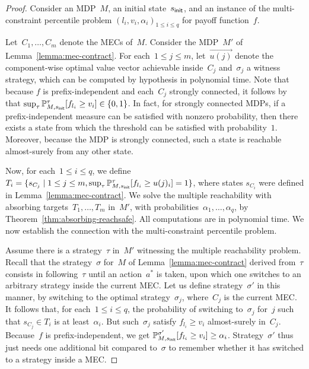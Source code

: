 \documentclass{llncs}
\newcommand{\initState}{\ensuremath{s_{{\sf init}}} }
\newcommand*{\pr}{\mathbb{P}}
\begin{document}
\begin{proof}
  Consider an MDP~$M$, an initial state~$\initState$, and an instance of the multi-constraint percentile problem $(l_i,v_i,\alpha_i)_{1\leq i\leq q}$ for payoff function~$f$.
  
  Let~$C_1,\ldots,C_m$ denote the MECs of~$M$.
  Consider the MDP~$M'$ of Lemma~\ref{lemma:mec-contract}.
  For each~$1\leq j\leq m$, let~$\vec{u(j)}$ denote the component-wise optimal value vector achievable inside~$C_j$ and~$\sigma_j$ a witness strategy,
  which can be computed by hypothesis in polynomial time. Note that because $f$ is prefix-independent and each~$C_j$ strongly connected,
  it follows by~\cite{Chatterjee-tcs07} that $\sup_{\tau} \pr_{M,\initState}^\tau[f_{l_i}\geq v_i] \in \{0,1\}$.
  In fact, for strongly connected MDPs, if a prefix-independent measure can be satisfied with nonzero probability, then there exists a state from which 
  the threshold can be satisfied with probability~$1$.
  Moreover, because the MDP is strongly connected, such a state is reachable almost-surely from any other state.

  Now, for each~$1\leq i\leq q$, we define~$T_i = \{ s_{C_j} \mid 1\leq j\leq m, \sup_{\tau} \pr_{M,\initState}^\tau [f_{l_i} \geq u(j)_i] = 1\}$,
  where states $s_{C_i}$ were defined in Lemma~\ref{lemma:mec-contract}.
  We solve the multiple reachability with absorbing targets~$T_1,\ldots,T_m$ in~$M'$, 
  with probabilities~$\alpha_1,\ldots,\alpha_q$, by Theorem~\ref{thm:absorbing-reachsafe}.
  All computations are in polynomial time. We now establish the connection with the multi-constraint percentile problem.

  Assume there is a strategy~$\tau$ in~$M'$ witnessing the multiple reachability problem. 
  Recall that the strategy~$\sigma$ for~$M$ of Lemma~\ref{lemma:mec-contract} derived from~$\tau$ consists in following~$\tau$ until an action~$a^*$ is taken, upon which 
  one switches to an arbitrary strategy inside the current MEC. Let us define strategy~$\sigma'$ in this manner,
  by switching to the optimal strategy~$\sigma_j$, where~$C_j$ is the current MEC. It follows that, for each~$1\leq i\leq q$, the probability of switching to~$\sigma_j$ for~$j$ such that
  $s_{C_j} \in T_i$ is at least~$\alpha_i$. But such~$\sigma_j$ satisfy $f_{l_i}\geq v_i$ almost-surely in~$C_j$. Because~$f$ is prefix-independent,
  we get $\pr_{M,\initState}^{\sigma'}[f_{l_i}\geq v_i] \geq \alpha_i$.
  Strategy~$\sigma'$ thus just needs one additional bit compared to~$\sigma$ to remember whether it has switched to a strategy inside a MEC.


\end{proof}
\end{document}
